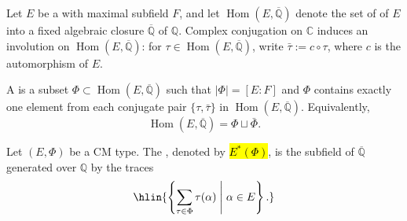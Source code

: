 \begin{definition} \label{definition:cm_type_and_reflex_field_of_a_cm_type}
    Let $E$ be a  with maximal  subfield $F$, and let $\operatorname{Hom}(E, \overline{\mathbb{Q}})$ denote the set of  of $E$ into a fixed algebraic closure $\overline{\mathbb{Q}}$ of $\mathbb{Q}$. Complex conjugation on $\mathbb{C}$ induces an involution on $\operatorname{Hom}(E, \overline{\mathbb{Q}})$: for $\tau \in \operatorname{Hom}(E, \overline{\mathbb{Q}})$, write $\bar{\tau} := c \circ \tau$, where $c$ is the  automorphism of $E$.

    A  is a subset $\Phi \subset \operatorname{Hom}(E, \overline{\mathbb{Q}})$ such that $|\Phi| = [E:F]$ and $\Phi$ contains exactly one element from each conjugate pair $\{\tau, \bar{\tau}\}$ in $\operatorname{Hom}(E, \overline{\mathbb{Q}})$. Equivalently,
    $$\operatorname{Hom}(E, \overline{\mathbb{Q}}) = \Phi \sqcup \bar{\Phi}.$$

    Let $(E, \Phi)$ be a CM type. The , denoted by \hl{$E^*(\Phi)$}, is the subfield of $\overline{\mathbb{Q}}$ generated over $\mathbb{Q}$ by the traces
    $$\hlin{\left\{ \sum_{\tau \in \Phi} \tau(\alpha) \;\middle|\; \alpha \in E \right\}.}$$
\end{definition}
